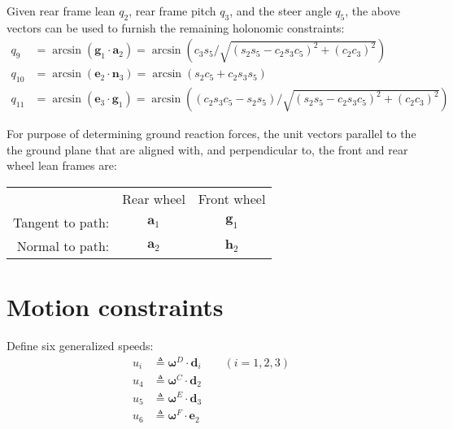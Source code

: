 \documentclass[letterpaper,11pt]{article}
\newcommand{\bs}[1]{ \boldsymbol{ #1 } }
\begin{document}
Given rear frame lean $q_2$, rear frame pitch $q_3$, and the steer angle
$q_5$, the above vectors can be used to furnish the remaining holonomic
constraints:
\begin{align*}
  q_9 & = \arcsin(\bs{g}_1 \cdot \bs{a}_2) = \arcsin\left(c_3 s_5 / \sqrt{(s_2 s_5 -
  c_2 s_3 c_5)^2 + (c_2 c_3)^2}\right) \\
  q_{10} & = \arcsin(\bs{e}_2 \cdot \bs{n}_3) = \arcsin\left(s_2 c_5 + c_2 s_3
  s_5\right)
  \\
  q_{11} & = \arcsin(\bs{e}_3 \cdot \bs{g}_1) = \arcsin \left( (c_2 s_3 c_5 - s_2
    s_5) /\sqrt{(s_2 s_5 - c_2 s_3 c_5)^2 + (c_2 c_3)^2}\right)
\end{align*}

For purpose of determining ground reaction forces, the unit vectors parallel to
the the ground plane that are aligned with, and perpendicular to, the front and
rear wheel lean frames are:
\begin{tabular}{rcc}
  & Rear wheel & Front wheel \\
  Tangent to path: & $\bs{a}_1$ & $\bs{g}_1$\\
  Normal to path: & $\bs{a}_2$ & $\bs{h}_2$
\end{tabular}

\section*{Motion constraints}
Define six generalized speeds:
\begin{align*}
  u_i & \triangleq \bs{\omega}^D \cdot \bs{d}_i \qquad (i = 1, 2, 3)\\
  u_4 & \triangleq \bs{\omega}^C \cdot \bs{d}_2\\
  u_5 & \triangleq \bs{\omega}^E \cdot \bs{d}_3\\
  u_6 & \triangleq \bs{\omega}^F \cdot \bs{e}_2
\end{align*}
\end{document}
